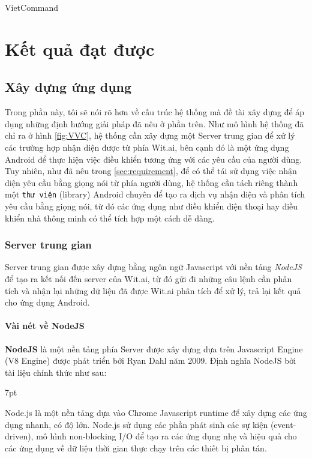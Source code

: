 \documentclass[12pt]{report}
\newenvironment{formal}{%
  \def\FrameCommand{%
    \hspace{1pt}%
    {\color{mygray}\vrule width 6pt}%
    {\color{lightgray}\vrule width 4pt}%
    \colorbox{lightgray}%
  }%
  \MakeFramed{\advance\hsize-\width\FrameRestore}%
  \noindent\hspace{-4.55pt}%
  \begin{adjustwidth}{}{7pt}%
  \vspace{2pt}\vspace{2pt}%
}
{%
  \vspace{2pt}\end{adjustwidth}\endMakeFramed%
}
\begin{document}
VietCommand 

\chapter{Kết quả đạt được}

\section{Xây dựng ứng dụng}

Trong phần này, tôi sẽ nói rõ hơn về cấu trúc hệ thống mà đề tài xây dựng để áp dụng những định hướng giải pháp đã nêu ở phần trên. Như mô hình hệ thống đã chỉ ra ở hình \ref{fig:VVC}, hệ thống cần xây dựng một Server trung gian để xử lý các trường hợp nhận diện được từ phía Wit.ai, bên cạnh đó là một ứng dụng Android để thực hiện việc điều khiển tương ứng với các yêu cầu của người dùng. Tuy nhiên, như đã nêu trong \ref{sec:requirement}, để có thể tái sử dụng việc nhận diện yêu cầu bằng giọng nói từ phía người dùng, hệ thống cần tách riêng thành một \texttt{thư viện} (library) Android chuyên để tạo ra dịch vụ nhận diện và phân tích yêu cầu bằng giọng nói, từ đó các ứng dụng như điều khiển điện thoại hay điều khiển nhà thông minh có thể tích hợp một cách dễ dàng.

\subsection{Server trung gian}

Server trung gian được xây dựng bằng ngôn ngữ Javascript với nền tảng \textit{NodeJS} để tạo ra kết nối đến server của Wit.ai, từ đó gửi đi những câu lệnh cần phân tích và nhận lại những dữ liệu đã được Wit.ai phân tích để xử lý, trả lại kết quả cho ứng dụng Android.

\subsubsection{Vài nét về NodeJS}

\textbf{NodeJS} là một nền tảng phía Server được xây dựng dựa trên Javascript Engine (V8 Engine) được phát triển bởi Ryan Dahl năm 2009. Định nghĩa NodeJS bởi tài liệu chính thức như sau:

\begin{formal}
Node.js là một nền tảng dựa vào Chrome Javascript runtime để xây dựng các ứng dụng nhanh, có độ lớn. Node.js sử dụng các phần phát sinh các sự kiện (event-driven), mô hình non-blocking I/O để tạo ra các ứng dụng nhẹ và hiệu quả cho các ứng dụng về dữ liệu thời gian thực chạy trên các thiết bị phân tán.
\end{formal}
\end{document}
